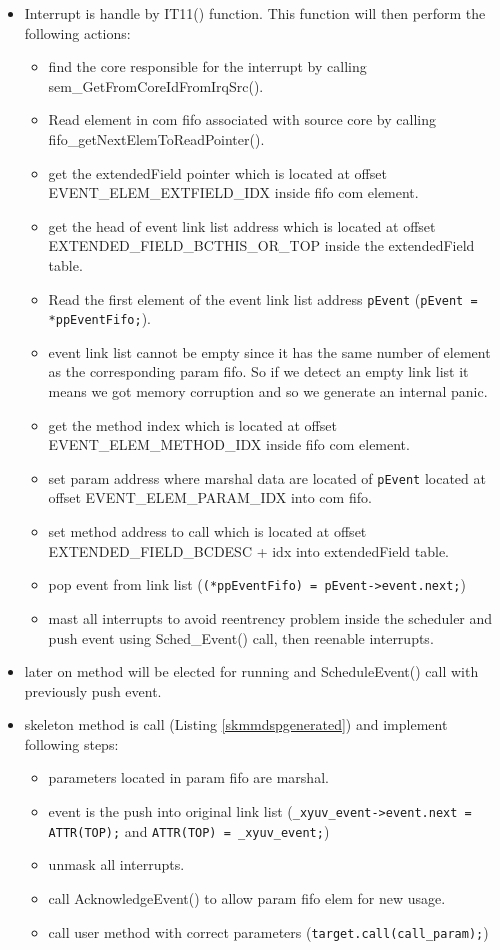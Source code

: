 \begin{itemize}
  \item Interrupt is handle by IT11() function. This function will then perform
  the following actions:
  \begin{itemize}
    \item find the core responsible for the interrupt by calling
    sem\_GetFromCoreIdFromIrqSrc().
    \item Read element in com fifo associated with source core by calling
    fifo\_getNextElemToReadPointer().
    \item get the extendedField pointer which is located at offset
    EVENT\_ELEM\_EXTFIELD\_IDX inside fifo com element.
    \item get the head of event link list address which is located at offset
    EXTENDED\_FIELD\_BCTHIS\_OR\_TOP inside the extendedField table.
    \item Read the first element of the event link list address \verb#pEvent#
    (\verb#pEvent = *ppEventFifo;#).
    \item event link list cannot be empty since it has the same number of
    element as the corresponding param fifo. So if we detect an empty link list
    it means we got memory corruption and so we generate an internal panic.
    \item get the method index which is located at offset
    EVENT\_ELEM\_METHOD\_IDX inside fifo com element.
    \item set param address where marshal data are located of \verb#pEvent#
    located at offset EVENT\_ELEM\_PARAM\_IDX into com fifo.
    \item set method address to call which is located at offset
    EXTENDED\_FIELD\_BCDESC + idx into extendedField table.
    \item pop event from link list (\verb#(*ppEventFifo) = pEvent->event.next;#)
    \item mast all interrupts to avoid reentrency problem inside the scheduler
    and push event using Sched\_Event() call, then reenable interrupts.
  \end{itemize}
  \item later on method will be elected for running and ScheduleEvent() call
  with previously push event.
  \item skeleton method is call (Listing \ref{skmmdspgenerated}) and implement
  following steps:
  \begin{itemize}
    \item parameters located in param fifo are marshal.
    \item event is the push into original link list
    (\verb#_xyuv_event->event.next = ATTR(TOP);# and
    \verb#ATTR(TOP) = _xyuv_event;#)
    \item unmask all interrupts.
    \item call AcknowledgeEvent() to allow param fifo elem for new usage.
    \item call user method with correct parameters
    (\verb#target.call(call_param);#)
  \end{itemize}
\end{itemize}
